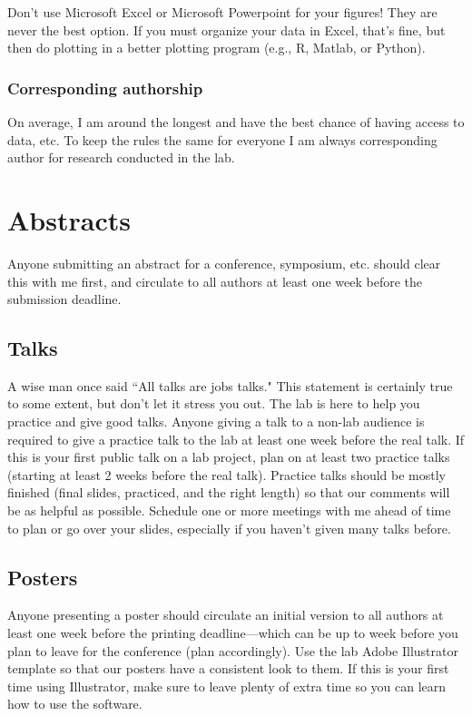 \documentclass[letterpaper,12pt,oneside]{memoir}
\begin{document}
{\begin{shaded}
\noindent Don't use Microsoft Excel or Microsoft Powerpoint for your figures! They are never the best option. If you must organize your data in Excel, that's fine, but then do plotting in a better plotting program (e.g., R, Matlab, or Python).
\end{shaded}


\subsubsection{Corresponding authorship}
On average, I am around the longest and have the best chance of having access to data, etc. To keep the rules the same for everyone I am always corresponding author for research conducted in the lab.



\section{Abstracts}
Anyone submitting an abstract for a conference, symposium, etc. should clear this with me first, and circulate to all authors at least one week before the submission deadline.

\subsection{Talks}
A wise man once said ``All talks are jobs talks." This statement is certainly true to some extent, but don't let it stress you out. The lab is here to help you practice and give good talks. Anyone giving a talk to a non-lab audience is required to give a practice talk to the lab at least one week before the real talk. If this is your first public talk on a lab project, plan on at least two practice talks (starting at least 2 weeks before the real talk). Practice talks should be mostly finished (final slides, practiced, and the right length) so that our comments will be as helpful as possible. Schedule one or more meetings with me ahead of time to plan or go over your slides, especially if you haven't given many talks before.

\subsection{Posters}
Anyone presenting a poster should circulate an initial version to all authors at least one week before the printing deadline---which can be up to week before you plan to leave for the conference (plan accordingly). Use the lab Adobe Illustrator template so that our posters have a consistent look to them. If this is your first time using Illustrator, make sure to leave plenty of extra time so you can learn how to use the software.

}
\end{document}
